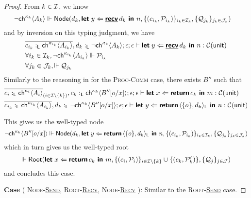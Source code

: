 \begin{proof}
  \noindent
  From $k \in \mathcal{I}$, we know
  \begin{align*}
    & \neg{\textsf{ch}^{\kappa_k}\langle{A_k}\rangle} \Vdash 
      \textsf{Node}({d_k}, {
        \textbf{\textsf{let}}\;{y}\Leftarrow{\underline{\textbf{\textsf{recv}}}\,{d_k}}\textbf{\textsf{ in }}{n}
      }, {
        \{ ( c_{i_k}, \mathcal{P}_{i_k} ) \}_{i_k \in \mathcal{I}_k},
        \{ \mathcal{Q}_{j_k} \}_{j_k \in \mathcal{J}_k}
      })
  \end{align*}
  and by inversion on this typing judgment, we have
  \begin{align*}
    & \overline{c_{i_k} :_{\textsf{L}} \textsf{ch}^{\kappa_{i_k}}\langle{A_{i_k}}\rangle}, d_k :_{\textsf{L}} \neg{\textsf{ch}^{\kappa_k}\langle{A_k}\rangle} ; 
      \epsilon ; \epsilon \vdash
      \textbf{\textsf{let}}\;{y}\Leftarrow{\underline{\textbf{\textsf{recv}}}\,{d_k}}\textbf{\textsf{ in }}{n} : 
      \mathcal{C}({\textsf{unit}}) \\
    & \forall i_k \in \mathcal{I}_k, \neg{\textsf{ch}^{\kappa_{i_k}}\langle{A_{i_k}}\rangle} \Vdash \mathcal{P}_{i_k} \\
    & \forall j_k \in \mathcal{J}_k, \Vdash \mathcal{Q}_{j_k}
  \end{align*}
  Similarly to the reasoning in  for the 
  \textsc{Proc-Comm} case, there exists $B''$ such that
  \begin{align*}
    &\overline{c_i :_{\textsf{L}} \textsf{ch}^{\kappa_i}\langle{A_i}\rangle}_{(i \in \mathcal{I} \setminus \{k\})}, 
     c_k :_{\textsf{L}} \textsf{ch}^{\kappa_k}\langle{B''[o/x]}\rangle ; \epsilon ; \epsilon \vdash 
     \textbf{\textsf{let}}\;{x}\Leftarrow{\textbf{\textsf{return}}\,{c_k}}\textbf{\textsf{ in }}{m} : \mathcal{C}({\textsf{unit}})
    \\
    &\overline{c_{i_k} :_{\textsf{L}} \textsf{ch}^{\kappa_{i_k}}\langle{A_{i_k}}\rangle}, 
     d_k :_{\textsf{L}} \neg{\textsf{ch}^{\kappa_k}\langle{B''[o/x]}\rangle} ; \epsilon ; \epsilon \vdash
     \textbf{\textsf{let}}\;{y}\Leftarrow{\textbf{\textsf{return}}\,{\langle{\{{o}\},{d_k}}\rangle_{\textsf{L}}}}\textbf{\textsf{ in }}{n} : 
     \mathcal{C}({\textsf{unit}})
  \end{align*}

  \noindent
  This gives us the well-typed node
  \begin{align*}
    \neg{\textsf{ch}^{\kappa_k}\langle{B''[o/x]}\rangle} \Vdash
    \textsf{Node}({d_k}, {
      \textbf{\textsf{let}}\;{y}\Leftarrow{\textbf{\textsf{return}}\,{\langle{\{{o}\},{d_k}}\rangle_{\textsf{L}}}}\textbf{\textsf{ in }}{n}
    }, {
      \{ ( c_{i_k}, \mathcal{P}_{i_k} ) \}_{i_k \in \mathcal{I}_k},
      \{ \mathcal{Q}_{j_k} \}_{j_k \in \mathcal{J}_k}
    })
  \end{align*}
  which in turn gives us the well-typed root
  \begin{align*}
    \Vdash \textsf{Root}({
      \textbf{\textsf{let}}\;{x}\Leftarrow{
        \textbf{\textsf{return}}\,{c_k}
      }\textbf{\textsf{ in }}{m} 
    }, {
      \{ (c_i, \mathcal{P}_i) \}_{i \in \mathcal{I} \setminus \{ k \}} \cup \{ (c_k, \mathcal{P}_k') \},
      \{ \mathcal{Q}_j \}_{j \in \mathcal{J}}
    })
  \end{align*}
  and concludes this case.

\noindent
\textbf{Case} (
  \textsc{Node-\underline{Send}}, 
  \textsc{Root-\underline{Recv}}, 
  \textsc{Node-\underline{Recv}}
): Similar to the \textsc{Root-\underline{Send}} case.


\end{proof}
